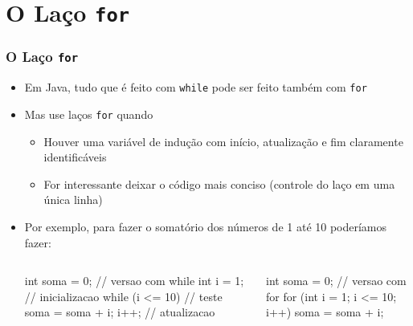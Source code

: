\documentclass[xcolor={dvipsnames,table},aspectratio=169]{beamer}
\begin{document}
\section{O Laço \texttt{for}}

\begin{frame}[fragile]\frametitle{O Laço \texttt{for}}
\begin{itemize}
    \item Em Java, tudo que é feito com \texttt{while} pode ser feito também com \texttt{for}
    \item Mas use laços \texttt{for} quando 
	\begin{itemize}
		\item Houver uma variável de indução com início, atualização e fim claramente identificáveis
		\item For interessante deixar o código mais conciso (controle do laço em uma única linha)
	\end{itemize}
	\item Por exemplo, para fazer o somatório dos números de 1 até 10 poderíamos fazer:
	
\begin{columns}[T]
	\begin{column}{0.5\linewidth}
{\scriptsize
\begin{javacode}
int soma = 0;
// versao com while
int i = 1;  // inicializacao
while (i <= 10)  { // teste
   soma = soma + i;
   i++; // atualizacao
}
\end{javacode}
}
	\end{column}
	\begin{column}{0.5\linewidth}
{\scriptsize
\begin{javacode}
int soma = 0;
// versao com for
for (int i = 1; i <= 10; i++) {
   soma = soma + i;
}
\end{javacode}
}
\end{column}
\end{columns}
\end{itemize}
\end{frame}
\end{document}
